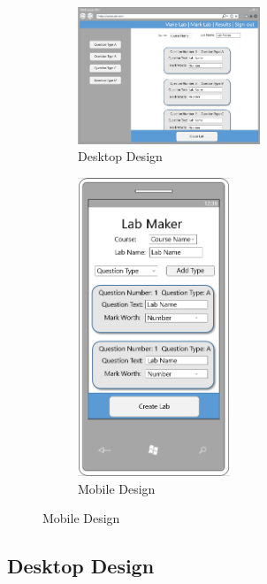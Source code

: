 \documentclass[11pt]{report}
\begin{document}
\begin{figure}[H]
\caption{Lab Creator Page}
\label{fig:creator-page}
\centering
\begin{subfigure}[c]{0.65\textwidth}
    \centering
    \includegraphics[width=0.6\textwidth]{images/design/maker-desktop.png}
    \caption{Desktop Design}
    \label{fig:design-maker-pc}
\end{subfigure}
\hfill
\begin{subfigure}[c]{0.3\textwidth}
    \centering
    \includegraphics[width=0.5\textwidth]{images/design/maker-mobile.png}
    \caption{Mobile Design}
    \label{fig:design-maker-mb}
\end{subfigure}
\end{figure}


\subsection*{Desktop Design}
\end{document}
